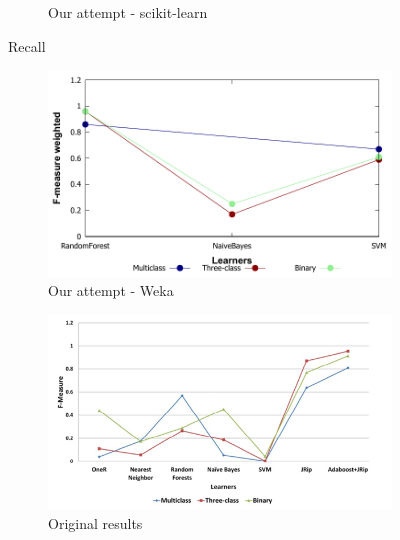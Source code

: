 \begin{figure}[H]
\begin{subfigure}[t]{0.4\textwidth}
        \caption{Our attempt - scikit-learn}
    \end{subfigure}
    \caption{Recall}
    \label{fig:recall}
\end{figure}

\begin{figure}[H]
    \centering
    \begin{subfigure}[t]{0.4\textwidth}
        \includegraphics[width=\linewidth]{images/weka_f1weight}
        \caption{Our attempt - Weka}
    \end{subfigure}%
    \begin{subfigure}[t]{0.4\textwidth}
        \includegraphics[width=\linewidth]{images/weka_f1_cite.png}
        \caption{Original results \cite{borges_hink_machine_2014-1}}
    \end{subfigure}
    \begin{subfigure}[t]{0.4\textwidth}

\end{subfigure}
\end{figure}
